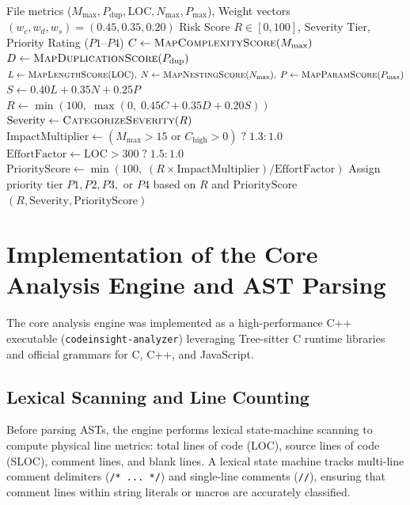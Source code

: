 \begin{algorithm}[H]
\caption{Explainable Technical Debt Scoring and Priority Triage}
\label{alg:risk_score}
\small
\begin{algorithmic}[1]
\Require File metrics ($M_{\max}, P_{\text{dup}}, \text{LOC}, N_{\max}, P_{\max}$), Weight vectors $(w_c, w_d, w_s) = (0.45, 0.35, 0.20)$
\Ensure Risk Score $R \in [0, 100]$, Severity Tier, Priority Rating ($P1$--$P4$)
\State $C \leftarrow \Call{MapComplexityScore}{M_{\max}}$ 
\State $D \leftarrow \Call{MapDuplicationScore}{P_{\text{dup}}}$ 
\State $L \leftarrow \Call{MapLengthScore}{\text{LOC}}, \; N \leftarrow \Call{MapNestingScore}{N_{\max}}, \; P \leftarrow \Call{MapParamScore}{P_{\max}}$
\State $S \leftarrow 0.40L + 0.35N + 0.25P$ 
\State $R \leftarrow \min(100, \; \max(0, \; 0.45C + 0.35D + 0.20S))$
\State $\text{Severity} \leftarrow \Call{CategorizeSeverity}{R}$ 
\State $\text{ImpactMultiplier} \leftarrow (M_{\max} > 15 \text{ or } C_{\text{high}} > 0) \; ? \; 1.3 : 1.0$
\State $\text{EffortFactor} \leftarrow \text{LOC} > 300 \; ? \; 1.5 : 1.0$
\State $\text{PriorityScore} \leftarrow \min(100, \; (R \times \text{ImpactMultiplier}) / \text{EffortFactor})$
\State Assign priority tier $P1, P2, P3, \text{ or } P4$ based on $R$ and $\text{PriorityScore}$
\State \Return $(R, \text{Severity}, \text{PriorityScore})$
\end{algorithmic}
\end{algorithm}

\section{Implementation of the Core Analysis Engine and AST Parsing}
The core analysis engine was implemented as a high-performance C++ executable (\texttt{codeinsight-analyzer}) leveraging Tree-sitter C runtime libraries~\cite{treesitter} and official grammars for C, C++, and JavaScript.

\subsection{Lexical Scanning and Line Counting}
Before parsing ASTs, the engine performs lexical state-machine scanning to compute physical line metrics: total lines of code (LOC), source lines of code (SLOC), comment lines, and blank lines. A lexical state machine tracks multi-line comment delimiters (\texttt{/* ... */}) and single-line comments (\texttt{//}), ensuring that comment lines within string literals or macros are accurately classified.

